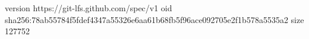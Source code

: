 version https://git-lfs.github.com/spec/v1
oid sha256:78ab55784f5fdef4347a55326e6aa61b68fb5f96ace092705e2f1b578a5535a2
size 127752
